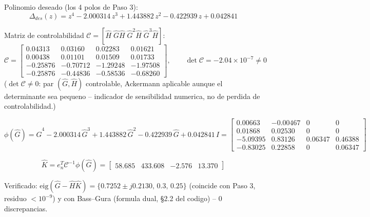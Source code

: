 \documentclass[11pt]{article}
\begin{document}
Polinomio deseado (los 4 polos de Paso 3):
\begin{equation}
\Delta_{des}(z)=z^4-2.000314\,z^3+1.443882\,z^2-0.422939\,z+0.042841
\end{equation}

Matriz de controlabilidad $\mathcal C=[\hat H\;\hat G\hat H\;\hat G^2\hat H\;\hat G^3\hat H]$:
\begin{equation}
\mathcal C=\begin{bmatrix}
0.04313&0.03160&0.02283&0.01621\\
0.00438&0.01101&0.01509&0.01733\\
-0.25876&-0.70712&-1.29248&-1.97508\\
-0.25876&-0.44836&-0.58536&-0.68260
\end{bmatrix},\qquad \det\mathcal C=-2.04\times10^{-7}\neq0
\end{equation}
($\det\mathcal C\neq0$: par $(\hat G,\hat H)$ controlable, Ackermann aplicable aunque el
determinante sea pequeno -- indicador de sensibilidad numerica, no de perdida de
controlabilidad.)

\begin{equation}
\phi(\hat G)=\hat G^4-2.000314\,\hat G^3+1.443882\,\hat G^2-0.422939\,\hat G+0.042841\,I
=\begin{bmatrix}0.00663&-0.00467&0&0\\0.01868&0.02530&0&0\\
-5.09395&0.83126&0.06347&0.46388\\-0.83025&0.22858&0&0.06347\end{bmatrix}
\end{equation}

\begin{resultbox}
\begin{equation}
\hat K=e_n^T\mathcal C^{-1}\phi(\hat G)=\begin{bmatrix}58.685&433.608&-2.576&13.370\end{bmatrix}
\end{equation}
\end{resultbox}
Verificado: $\mathrm{eig}(\hat G-\hat H\hat K)=\{0.7252{\pm}j0.2130,\,0.3,\,0.25\}$
(coincide con Paso 3, residuo $<10^{-9}$) y con Bass--Gura (formula dual, \S2.2 del
codigo) -- 0 discrepancias.
\end{document}
